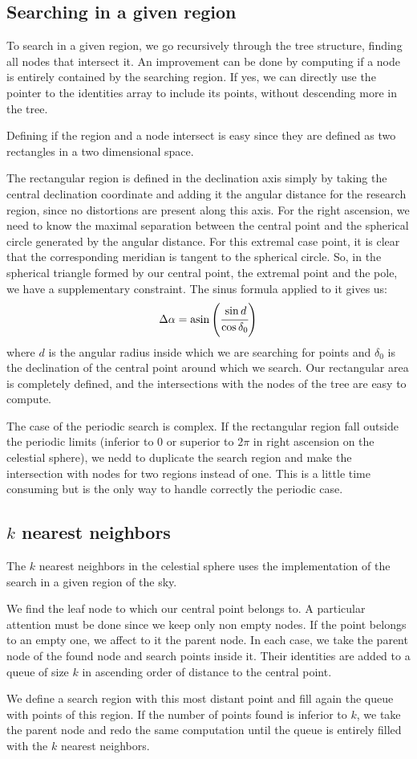 \subsection{Searching in a given region}
%
To search in a given region, we go recursively through the tree structure, finding all
nodes that intersect it. An improvement can be done by computing if a node
is entirely contained by the searching region. If yes, we can directly use
the pointer to the identities array to include its points, without
descending more in the tree.

Defining if the region and a node intersect is easy since they are defined
as two rectangles in a two dimensional space.

The rectangular region is defined in the declination axis simply by taking
the central declination coordinate and adding it the angular distance for
the research region, since no distortions are present along this axis. For
the right ascension, we need to know the maximal separation between the
central point and the spherical circle generated by the angular distance.
For this extremal case point, it is clear that the corresponding meridian is
tangent to the spherical circle. So, in the spherical triangle formed by our
central point, the extremal point and the pole, we have a supplementary
constraint. The sinus formula applied to it gives us:
%
\begin{equation}
    \Delta\alpha = \mathrm{asin}\left(\cfrac{\sin d}{\cos\delta_0}\right)
\end{equation}
%
where $d$ is the angular radius inside which we are searching for points and
$\delta_0$ is the declination of the central point around which we search.
Our rectangular area is completely defined, and the intersections with the
nodes of the tree are easy to compute.

The case of the periodic search is complex. If the rectangular region fall
outside the periodic limits (inferior to 0 or superior to $2\pi$ in right
ascension on the celestial sphere), we nedd to duplicate the search region
and make the intersection with nodes for two regions instead of one. This is
a little time consuming but is the only way to handle correctly the periodic
case.
%
\subsection{$k$ nearest neighbors}
%
The $k$ nearest neighbors in the celestial sphere uses the implementation of
the search in a given region of the sky.

We find the leaf node to which our central point belongs to. A particular
attention must be done since we keep only non empty nodes. If the point
belongs to an empty one, we affect to it the parent node. In each case, we
take the parent node of the found node and search points inside it. Their
identities are added to a queue of size $k$ in ascending order of distance
to the central point.

We define a search region with this most distant point and fill again the
queue with points of this region. If the number of points found is inferior
to $k$, we take the parent node and redo the same computation until the
queue is entirely filled with the $k$ nearest neighbors.
